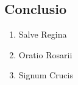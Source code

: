 \subsection*{Conclusio}

\begin{enumerate}[label={\roman*.}, itemsep=0pt]

\item Salve Regina
\item Oratio Rosarii
\item Signum Crucis
\end{enumerate}